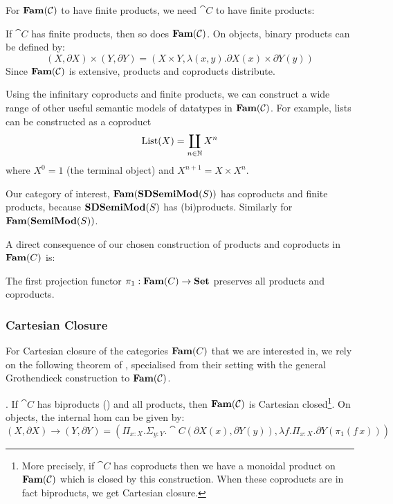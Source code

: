 For $\mathbf{Fam}(\mathcal{C})$ to have finite products, we need $\cat{C}$ to have
finite products:

\begin{proposition}
  If $\cat{C}$ has finite products, then so does $\mathbf{Fam}(\mathcal{C})$. On
  objects, binary products can be defined by:
  \begin{displaymath}
    (X, \partial X) \times (Y, \partial Y) = (X \times Y, \lambda (x, y). \partial X(x) \times \partial Y(y))
  \end{displaymath}
  Since $\mathbf{Fam}(\mathcal{C})$ is extensive, products and coproducts
  distribute.
\end{proposition}

Using the infinitary coproducts and finite products, we can construct
a wide range of other useful semantic models of datatypes in
$\mathbf{Fam}(\mathcal{C})$. For example, lists can be constructed as a coproduct
\begin{equation}
  \label{eqn:lists}
  \mathrm{List}(X) = \coprod_{n \in \mathbb{N}} X^n
\end{equation}
where $X^0 = 1$ (the terminal object) and $X^{n+1} = X \times X^n$.

Our category of interest, $\mathbf{Fam}(\mathbf{SDSemiMod}(S))$ has coproducts
  and finite products, because $\mathbf{SDSemiMod}(S)$ has
  (bi)products. Similarly for $\mathbf{Fam}(\mathbf{SemiMod}(S))$.

A direct consequence of our chosen construction of products and
coproducts in $\mathbf{Fam}(C)$ is:

\begin{lemma}
  \label{lem:pi1-preserve-products-and-coproducts}
  The first projection functor $\pi_1 : \mathbf{Fam}(C) \to \mathbf{Set}$ preserves
  all products and coproducts.
\end{lemma}

\subsubsection{Cartesian Closure}
\label{sec:models:Cartesian-closure}

For Cartesian closure of the categories $\mathbf{Fam}(C)$ that we are
interested in, we rely on the following theorem of \citet{nunes2023},
specialised from their setting with the general Grothendieck
construction to $\mathbf{Fam}(\mathcal{C})$.

\begin{theorem}
  \label{thm:fam-closed}
  \AGDA.  If $\cat{C}$ has biproducts () and all
  products, then $\mathbf{Fam}(\mathcal{C})$ is Cartesian closed\footnote{More
    precisely, if $\cat{C}$ has coproducts then we have a monoidal
    product on $\mathbf{Fam}(\mathcal{C})$ which is closed by this
    construction. When these coproducts are in fact biproducts, we get
    Cartesian closure.}. On objects, the internal hom can be given by:
  \begin{displaymath}
    (X, \partial X) \to (Y, \partial Y) = (\Pi_{x : X}. \Sigma_{y : Y}. \cat{C}(\partial X(x), \partial Y(y)), \lambda f. \Pi_{x : X}. \partial Y(\pi_1(f\, x)))
  \end{displaymath}
\end{theorem}

